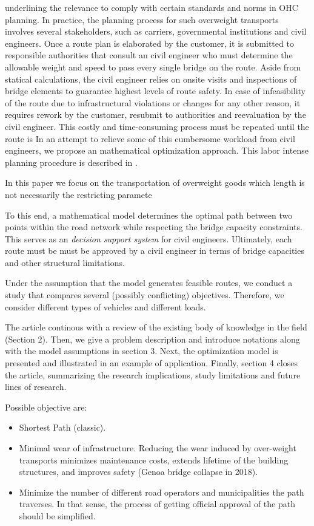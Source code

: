 underlining the relevance to comply with certain standards and norms in OHC planning. In practice, the planning process for such overweight transports involves several stakeholders, such as carriers, governmental institutions and civil engineers. Once a route plan is elaborated by the  customer, it is submitted to responsible authorities that consult an civil engineer who must determine the allowable weight and speed to pass every single bridge on the route. Aside from statical calculations, the civil engineer relies on onsite visits and inspections of bridge elements to guarantee highest levels of route safety. In case of infeasibility of the route due to infrastructural violations or changes for any other reason, it requires rework by the customer, resubmit to authorities and reevaluation by the civil engineer. This costly and time-consuming process must be repeated until the route is  In an attempt to relieve some of this cumbersome workload from civil engineers, we propose an mathematical optimization approach. This labor intense planning procedure is described in \cite{Osegueda.1999}. 








In this paper we focus on the transportation of overweight goods which length is not necessarily the restricting paramete


To this end, a mathematical model determines the optimal path between two
points within the road network while respecting the bridge capacity constraints.
This serves as an \textit{decision support system} for civil engineers.
Ultimately,  each route must be must be approved by a civil engineer  in terms of
bridge capacities and other structural limitations.

Under the assumption that the model generates feasible routes,
we conduct a study that compares several (possibly conflicting) objectives.
Therefore, we consider different types of vehicles and different loads.


The article continous with a review of the existing body of knowledge in the field (Section 2). Then, we give a problem description and introduce notations along with the model assumptions in section 3. Next, the optimization model is presented and illustrated in an example of application. Finally, section 4 closes the article, summarizing the research implications, study limitations and future lines of research. 


Possible objective are:
\begin{itemize}
  \item Shortest Path (classic).

  \item Minimal wear of infrastructure. Reducing the wear induced by over-weight transports
  minimizes maintenance costs, extends lifetime of the building structures, and
  improves safety (Genoa bridge collapse in 2018).

  \item Minimize the number of different road operators and municipalities the path
  traverses. In that sense, the process of getting official approval of the
  path should be simplified.
\end{itemize}

